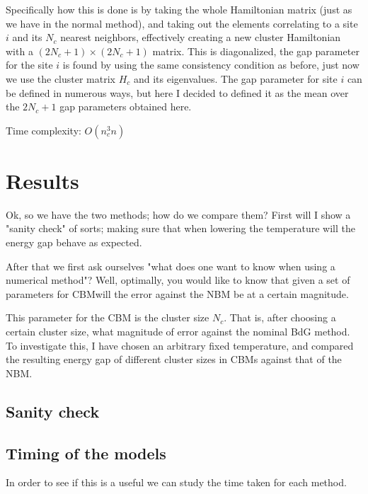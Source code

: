 \documentclass[11pt]{article}
\begin{document}
Specifically how this is done is by taking the whole Hamiltonian matrix (just as we have in the normal method), and taking out the elements correlating to a site $i$ and its $N_c$ nearest neighbors, effectively creating a new cluster Hamiltonian with a $(2N_c + 1)\times(2N_c + 1)$ matrix. This is diagonalized, the gap parameter for the site $i$ is found by using the same consistency condition as before, just now we use the cluster matrix $H_c$ and its eigenvalues. The gap parameter for site $i$ can be defined in numerous ways, but here I decided to defined it as the mean over the $2N_c + 1$ gap parameters obtained here. 


Time complexity: $ O(n_c^3n) $

\section{Results}\label{sec:results}


Ok, so we have the two methods; how do we compare them? First will I show a "sanity check" of sorts; making sure that when lowering the temperature will the energy gap behave as expected. 

After that we first ask ourselves "what does one want to know when using a numerical method"? Well, optimally, you would like to know that given a set of parameters for CBMwill the error against the NBM be at a certain magnitude.

This parameter for the CBM is the cluster size $N_c$. That is, after choosing a certain cluster size, what magnitude of error against the nominal BdG method. To investigate this, I have chosen an arbitrary fixed temperature, and compared the resulting energy gap of different cluster sizes in CBMs against that of the NBM. 

\subsection{Sanity check} %
\label{sub:sanity_check}


\subsection{Timing of the models} %
\label{sec:timing}
In order to see if this is a useful we can study the time taken for each method. 
\end{document}
